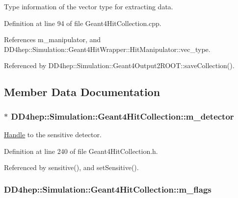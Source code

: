Type information of the vector type for extracting data. 

Definition at line 94 of file Geant4HitCollection.cpp.

References m\_\-manipulator, and DD4hep::Simulation::Geant4HitWrapper::HitManipulator::vec\_\-type.

Referenced by DD4hep::Simulation::Geant4Output2ROOT::saveCollection().

\subsection{Member Data Documentation}
\hypertarget{class_d_d4hep_1_1_simulation_1_1_geant4_hit_collection_aaf3c4ccd370663a99af26333af3486e7}{
\subsubsection[{m\_\-detector}]{$\ast$ {\bf DD4hep::Simulation::Geant4HitCollection::m\_\-detector}}}
\label{class_d_d4hep_1_1_simulation_1_1_geant4_hit_collection_aaf3c4ccd370663a99af26333af3486e7}


\hyperlink{class_d_d4hep_1_1_handle}{Handle} to the sensitive detector. 

Definition at line 240 of file Geant4HitCollection.h.

Referenced by sensitive(), and setSensitive().\hypertarget{class_d_d4hep_1_1_simulation_1_1_geant4_hit_collection_a9c557501c37d783cbc1be1443aef03a9}{
\subsubsection[{m\_\-flags}]{ {\bf DD4hep::Simulation::Geant4HitCollection::m\_\-flags}}}
\label{class_d_d4hep_1_1_simulation_1_1_geant4_hit_collection_a9c557501c37d783cbc1be1443aef03a9}



